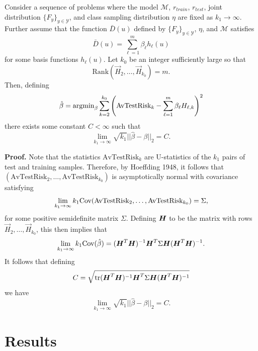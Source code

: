 \documentclass[12pt]{article}
\begin{document}
\begin{theorem}
Consider a sequence of problems where the model $\mathcal{M}$,
$r_{train}$, $r_{test}$, joint distribution
$\{F_y\}_{y \in \mathcal{Y}}$, and class sampling distribution $\eta$
are fixed as $k_1 \to \infty$.  Further assume that the function
$\bar{D}(u)$ defined by $\{F_y\}_{y \in \mathcal{Y}}$, $\eta$, and
$\mathcal{M}$ satisfies
\[
\bar{D}(u) = \sum_{\ell = 1}^m \beta_\ell h_\ell(u)
\]
for some basis functions $h_\ell(u)$.
Let $k_0$ be an integer sufficiently large so that
\[
\text{Rank}(\vec{H}_2,\hdots,\vec{H}_{k_0}) = m.
\]
Then, defining
\[
\hat{\beta} = \text{argmin}_\beta \sum_{k=2}^{k_0} \left(\text{AvTestRisk}_k - \sum_{\ell=1}^m \beta_\ell H_{\ell, k}\right)^2
\]
there exists some constant $C < \infty$ such that
\[
\lim_{k_1 \to \infty} \sqrt{k_1}||\hat{\beta}-\beta||_2 = C.
\]
\end{theorem}

\textbf{Proof.}
Note that the statistics $\text{AvTestRisk}_k$ are U-statistics of the
$k_1$ pairs of test and training samples.  Therefore, by Hoeffding
1948, it follows that
$(\text{AvTestRisk}_2,\hdots, \text{AvTestRisk}_{k_0})$ is
asymptotically normal with covariance satisfying
\[
\lim_{k_1 \to \infty} k_1 \text{Cov}(\text{AvTestRisk}_2,\hdots, \text{AvTestRisk}_{k_0}) = \Sigma,
\]
for some positive semidefinite matrix $\Sigma$.  Defining $\boldsymbol{H}$ to be
the matrix with rows $\vec{H}_2,\hdots,\vec{H}_{k_0}$, this then
implies that
\[
\lim_{k_1 \to \infty} k_1 \text{Cov}(\hat{\beta}) = (\boldsymbol{H}^T \boldsymbol{H})^{-1} \boldsymbol{H}^T \Sigma \boldsymbol{H} (\boldsymbol{H}^T \boldsymbol{H})^{-1}.
\]
It follows that defining
\[
C = \sqrt{\text{tr} (\boldsymbol{H}^T \boldsymbol{H})^{-1} \boldsymbol{H}^T \Sigma \boldsymbol{H} (\boldsymbol{H}^T \boldsymbol{H})^{-1}}
\]
we have
\[
\lim_{k_1 \to \infty} \sqrt{k_1}||\hat{\beta}-\beta||_2 = C.
\]

\section{Results}
\end{document}
